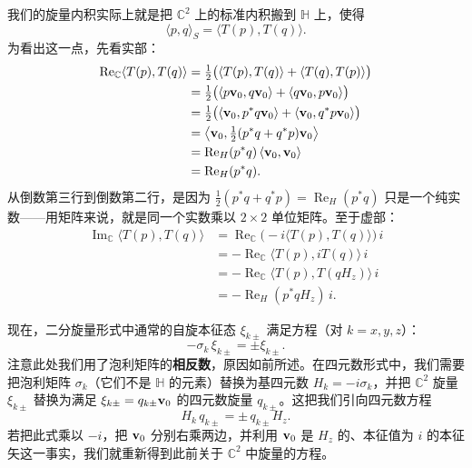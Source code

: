 我们的旋量内积实际上就是把 $\mathbb{C}^{2}$ 上的标准内积搬到 $\mathbb{H}$ 上，使得
\begin{equation}
\langle p,q\rangle_{S}=\langle T(p),T(q)\rangle.
\end{equation}
为看出这一点，先看实部：
\begin{align*}
\operatorname{Re}_{\mathbb{C}}\langle T(p),T(q)\rangle
&= \tfrac12\bigl(\langle T(p),T(q)\rangle+\langle T(q),T(p)\rangle\bigr)\\
&= \tfrac12\bigl(\langle p\mathbf{v}_{0},q\mathbf{v}_{0}\rangle+\langle q\mathbf{v}_{0},p\mathbf{v}_{0}\rangle\bigr)\\
&= \tfrac12\bigl(\langle \mathbf{v}_{0},p^{*}q\mathbf{v}_{0}\rangle+\langle \mathbf{v}_{0},q^{*}p\mathbf{v}_{0}\rangle\bigr)\\
&= \bigl\langle \mathbf{v}_{0},\tfrac12(p^{*}q+q^{*}p)\mathbf{v}_{0}\bigr\rangle\\
&= \operatorname{Re}_{H}(p^{*}q)\,\langle \mathbf{v}_{0},\mathbf{v}_{0}\rangle\\
&= \operatorname{Re}_{H}(p^{*}q).
\end{align*}
从倒数第三行到倒数第二行，是因为 $\tfrac12(p^{*}q+q^{*}p)=\operatorname{Re}_{H}(p^{*}q)$ 只是一个纯实数——用矩阵来说，就是同一个实数乘以 $2\times2$ 单位矩阵。至于虚部：
\begin{align*}
\operatorname{Im}_{\mathbb{C}}\langle T(p),T(q)\rangle
&= \operatorname{Re}_{\mathbb{C}}\bigl(-i\langle T(p),T(q)\rangle\bigr)\,i\\
&= -\operatorname{Re}_{\mathbb{C}}\langle T(p),iT(q)\rangle\,i\\
&= -\operatorname{Re}_{\mathbb{C}}\langle T(p),T(qH_{z})\rangle\,i\\
&= -\operatorname{Re}_{H}(p^{*}qH_{z})\,i.
\end{align*}

现在，二分旋量形式中通常的自旋本征态 $\xi_{k\pm}$ 满足方程（对 $k=x,y,z$）：
\begin{equation}
-\sigma_{k}\,\xi_{k\pm}=\pm\xi_{k\pm}.
\end{equation}
注意此处我们用了泡利矩阵的\textbf{相反数}，原因如前所述。在四元数形式中，我们需要把泡利矩阵 $\sigma_{k}$（它们不是 $\mathbb{H}$ 的元素）替换为基四元数 $H_{k}=-i\sigma_{k}$，并把 $\mathbb{C}^{2}$ 旋量 $\xi_{k\pm}$ 替换为满足 $\xi_{k\pm}=q_{k\pm}\mathbf{v}_{0}$ 的四元数旋量 $q_{k\pm}$。这把我们引向四元数方程
\begin{equation}
H_{k}\,q_{k\pm}=\pm\,q_{k\pm}H_{z}.
\end{equation}
若把此式乘以 $-i$，把 $\mathbf{v}_{0}$ 分别右乘两边，并利用 $\mathbf{v}_{0}$ 是 $H_{z}$ 的、本征值为 $i$ 的本征矢这一事实，我们就重新得到此前关于 $\mathbb{C}^{2}$ 中旋量的方程。

